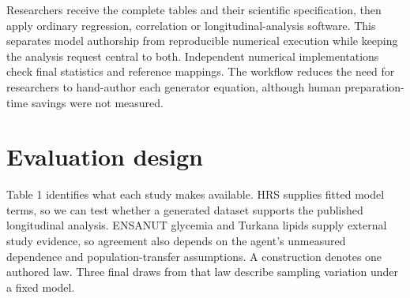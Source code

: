\documentclass[sigconf,anonymous,review]{acmart}
\begin{document}
Researchers receive the complete tables and their scientific specification, then apply ordinary regression, correlation or longitudinal-analysis software. This separates model authorship from reproducible numerical execution while keeping the analysis request central to both. Independent numerical implementations check final statistics and reference mappings. The workflow reduces the need for researchers to hand-author each generator equation, although human preparation-time savings were not measured.


\section{Evaluation design}

Table 1 identifies what each study makes available. HRS supplies fitted model terms, so we can test whether a generated dataset supports the published longitudinal analysis. ENSANUT glycemia and Turkana lipids supply external study evidence, so agreement also depends on the agent's unmeasured dependence and population-transfer assumptions. A construction denotes one authored law. Three final draws from that law describe sampling variation under a fixed model.
\end{document}
